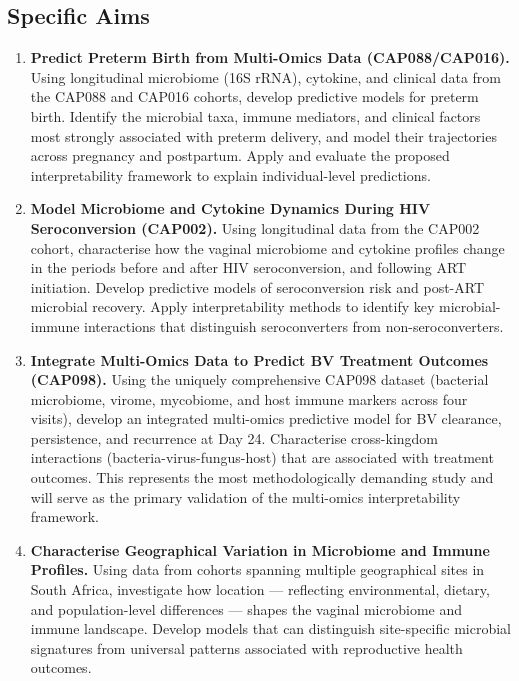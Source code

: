 \documentclass[12pt,a4paper]{report}
\begin{document}
\subsection{Specific Aims}

\begin{enumerate}[label=\textbf{Paper \arabic*:}]

\item \textbf{Predict Preterm Birth from Multi-Omics Data (CAP088/CAP016).}
Using longitudinal microbiome (16S rRNA), cytokine, and clinical data from the CAP088 and CAP016 cohorts, develop predictive models for preterm birth. Identify the microbial taxa, immune mediators, and clinical factors most strongly associated with preterm delivery, and model their trajectories across pregnancy and postpartum. Apply and evaluate the proposed interpretability framework to explain individual-level predictions.

\item \textbf{Model Microbiome and Cytokine Dynamics During HIV Seroconversion (CAP002).}
Using longitudinal data from the CAP002 cohort, characterise how the vaginal microbiome and cytokine profiles change in the periods before and after HIV seroconversion, and following ART initiation. Develop predictive models of seroconversion risk and post-ART microbial recovery. Apply interpretability methods to identify key microbial-immune interactions that distinguish seroconverters from non-seroconverters.

\item \textbf{Integrate Multi-Omics Data to Predict BV Treatment Outcomes (CAP098).}
Using the uniquely comprehensive CAP098 dataset (bacterial microbiome, virome, mycobiome, and host immune markers across four visits), develop an integrated multi-omics predictive model for BV clearance, persistence, and recurrence at Day 24. Characterise cross-kingdom interactions (bacteria-virus-fungus-host) that are associated with treatment outcomes. This represents the most methodologically demanding study and will serve as the primary validation of the multi-omics interpretability framework.

\item \textbf{Characterise Geographical Variation in Microbiome and Immune Profiles.}
Using data from cohorts spanning multiple geographical sites in South Africa, investigate how location --- reflecting environmental, dietary, and population-level differences --- shapes the vaginal microbiome and immune landscape. Develop models that can distinguish site-specific microbial signatures from universal patterns associated with reproductive health outcomes.

\end{enumerate}
\end{document}
